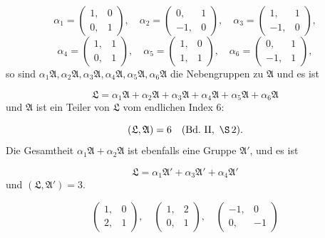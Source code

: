 \[
\alpha_1 = \begin{pmatrix}1, & 0\\ 0, & 1\end{pmatrix}, \quad \alpha_2 = \begin{pmatrix}0, & 1\\ -1, & 0\end{pmatrix}, \quad \alpha_3 = \begin{pmatrix}1, & 1\\ -1, & 0\end{pmatrix},
\]
\[
\alpha_4 = \begin{pmatrix}1, & 1\\ 0, & 1\end{pmatrix}, \quad \alpha_5 = \begin{pmatrix}1, & 0\\ 1, & 1\end{pmatrix}, \quad \alpha_6 = \begin{pmatrix}0, & 1\\ -1, & 1\end{pmatrix},
\]
so sind $\alpha_1\mathfrak{A}, \alpha_2\mathfrak{A}, \alpha_3\mathfrak{A}, \alpha_4\mathfrak{A}, \alpha_5\mathfrak{A}, \alpha_6\mathfrak{A}$ die Nebengruppen zu $\mathfrak{A}$ und es ist

\[
\mathfrak{L} = \alpha_1\mathfrak{A} + \alpha_2\mathfrak{A} + \alpha_3\mathfrak{A} + \alpha_4\mathfrak{A} + \alpha_5\mathfrak{A} + \alpha_6\mathfrak{A}
\]
und $\mathfrak{A}$ ist ein Teiler von $\mathfrak{L}$ vom endlichen Index 6:

\[
(\mathfrak{L}, \mathfrak{A}) = 6 \quad (\text{Bd.\ II}, \ \S\,2).
\]
Die Gesamtheit $\alpha_1\mathfrak{A} + \alpha_2\mathfrak{A}$ ist ebenfalls eine Gruppe $\mathfrak{A}'$, und es ist

\[
\mathfrak{L} = \alpha_1\mathfrak{A}' + \alpha_3\mathfrak{A}' + \alpha_4\mathfrak{A}'
\]
und $(\mathfrak{L}, \mathfrak{A}') = 3$.


\[
\begin{pmatrix}1, & 0\\ 2, & 1\end{pmatrix}, \quad \begin{pmatrix}1, & 2\\ 0, & 1\end{pmatrix}, \quad \begin{pmatrix}-1, & 0\\ 0, & -1\end{pmatrix}
\]

